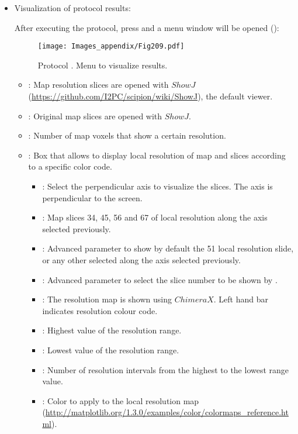 \begin{itemize}
  \item Visualization of protocol results:
  
  After executing the protocol, press  and a menu window will be opened ():
  
  \begin{figure}[H]
     \centering 
     \captionsetup{width=.7\linewidth} 
     \texttt{[image: Images\_appendix/Fig209.pdf]}
     \caption{Protocol . Menu to visualize results.}
     \label{fig:app_localMonoRes_2}
    \end{figure}
    
   \begin{itemize}
     \item {}: Map resolution slices are opened with $ShowJ$ (\url{https://github.com/I2PC/scipion/wiki/ShowJ}), the default \scipion viewer.
     \item {}: Original map slices are opened with $ShowJ$.
     \item {}: Number of map voxels that show a certain resolution.
     \item {}: Box that allows to display local resolution of map and slices according to a specific color code.
     \begin{itemize}
        \item {}: Select the perpendicular axis to visualize the slices. The  axis is perpendicular to the screen.
        \item {}: Map slices 34, 45, 56 and 67 of local resolution along the axis selected previously.
        \item {}: Advanced parameter to show by default the 51 local resolution slide, or any other selected along the axis selected previously.
        \item {}:  Advanced parameter to select the slice number to be shown by .
        \item {}: The resolution map is shown using $ChimeraX$. Left hand bar indicates resolution colour code. 
        \item {}: Highest value of the resolution range.
        \item {}: Lowest value of the resolution range.
        \item {}: Number of resolution intervals from the highest to the lowest range value.
        \item {}: Color to apply to the local resolution map (\url{http://matplotlib.org/1.3.0/examples/color/colormaps_reference.html}).
     \end{itemize}
   \end{itemize} 



\end{itemize}
